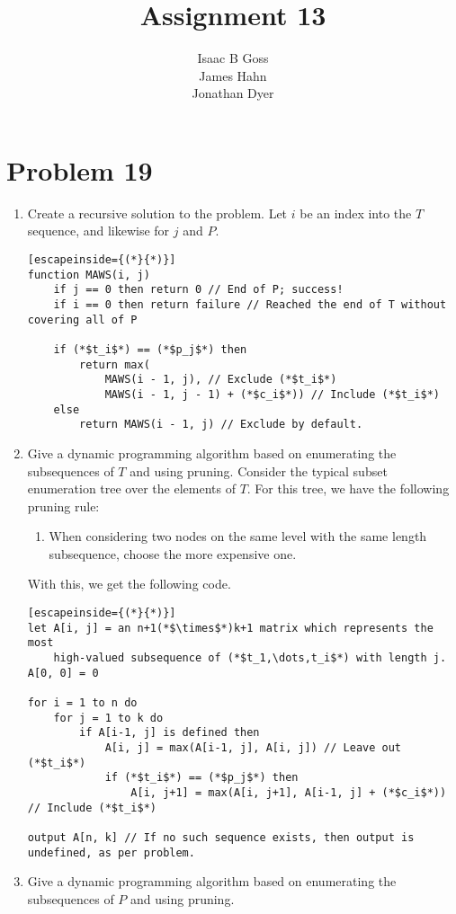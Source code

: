 \documentclass{article}
\author{Isaac B Goss\\ James Hahn\\ Jonathan Dyer}
\title{Assignment 13}
\providecommand{\prob}[1]{\section*{Problem #1}}
\begin{document}
\maketitle

    \prob{19}
    \begin{enumerate}[label=(\alph*)]
        \item Create a recursive solution to the problem.
            Let $i$ be an index into the $T$ sequence, and likewise for $j$ and $P$.
            \begin{lstlisting}[escapeinside={(*}{*)}]
function MAWS(i, j)
    if j == 0 then return 0 // End of P; success!
    if i == 0 then return failure // Reached the end of T without covering all of P

    if (*$t_i$*) == (*$p_j$*) then
        return max(
            MAWS(i - 1, j), // Exclude (*$t_i$*)
            MAWS(i - 1, j - 1) + (*$c_i$*)) // Include (*$t_i$*)
    else
        return MAWS(i - 1, j) // Exclude by default.
            \end{lstlisting}
        \item Give a dynamic programming algorithm based on enumerating the subsequences of $T$ and using pruning.
            Consider the typical subset enumeration tree over the elements of $T$.
            For this tree, we have the following pruning rule:
            \begin{enumerate}[label=\arabic*.]
                \item When considering two nodes on the same level with the same length subsequence, choose the more expensive one.
            \end{enumerate}

            With this, we get the following code.
            \begin{lstlisting}[escapeinside={(*}{*)}]
let A[i, j] = an n+1(*$\times$*)k+1 matrix which represents the most
    high-valued subsequence of (*$t_1,\dots,t_i$*) with length j.
A[0, 0] = 0

for i = 1 to n do
    for j = 1 to k do
        if A[i-1, j] is defined then
            A[i, j] = max(A[i-1, j], A[i, j]) // Leave out (*$t_i$*)
            if (*$t_i$*) == (*$p_j$*) then
                A[i, j+1] = max(A[i, j+1], A[i-1, j] + (*$c_i$*)) // Include (*$t_i$*)

output A[n, k] // If no such sequence exists, then output is undefined, as per problem.
            \end{lstlisting}

        \item Give a dynamic programming algorithm based on enumerating the subsequences of $P$ and using pruning.
    \end{enumerate}
\end{document}

